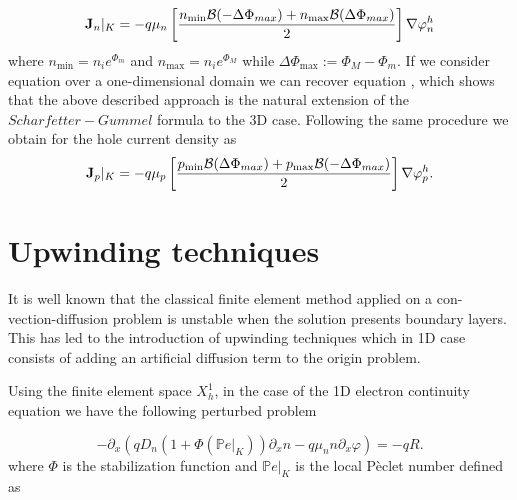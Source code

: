 \begin{equation}
\label{eq: first formula for J}
\mathbf{J}_n|_K = -  q \mu_n  \left[ \dfrac{ n_{\min} \mathcal{B}(-\Delta \Phi_{max})  + n_{\max}\mathcal{B}(\Delta \Phi_{max})}{2} \right]\nabla \varphi_n^h
\end{equation}
where $n_{\min}=n_i e^{\Phi_m}$ and $n_{\max}=n_i e^{\Phi_M}$ while $\Delta \Phi_{\max} := \Phi_M - \Phi_m$. If we consider equation  over a one-dimensional domain we can recover equation , which shows that the above described approach is the natural extension of the $Scharfetter-Gummel$ formula to the 3D case.
Following the same procedure we obtain for the hole current density as
\begin{equation}
\label{eq: first formula for Jp}
\mathbf{J}_p|_K = -  q \mu_p  \left[ \dfrac{ p_{\min} \mathcal{B}(\Delta \Phi_{max})  + p_{\max}\mathcal{B}(-\Delta \Phi_{max})}{2} \right]\nabla \varphi_p^h.
\end{equation}


\section{Upwinding techniques}
\label{sec: SG 3D upwind}
It is well known that the classical finite element method applied on a con- vection-diffusion problem is unstable when the solution presents boundary layers. This has led to the introduction of upwinding techniques which in 1D case consists of adding an artificial diffusion term to the origin problem.


Using the finite element space $X_h^1$, in the case of the 1D electron continuity equation we have the following perturbed problem

\begin{equation}
\label{eq: perturbed problem}
- \partial_x  (qD_n(1+\Phi(\mathbb{P}e|_K))\partial_x n - q \mu_n n \partial_x \varphi) = -qR.
\end{equation}
where $\Phi$ is the stabilization function and $\mathbb{P}e|_K$ is the local P\`eclet number defined as 
 
